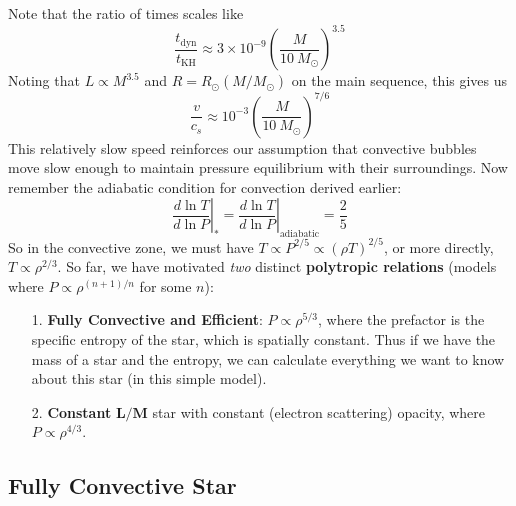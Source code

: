 \documentclass[10pt]{article}
\numberwithin{equation}{section}
\newcommand{\n}{\noindent}
\begin{document}
  \n Note that the ratio of times scales like
  \begin{equation}
    \label{eq:49}
    \frac{t_{\mathrm{dyn}}}{t_{\mathrm{KH}}}\approx 3\times
    10^{-9}\left(\frac{M}{10\ M_\odot}\right)^{3.5}
  \end{equation}
  Noting that $L\propto M^{3.5}$ and $R=R_\odot(M/M_\odot)$ on the
  main sequence, this gives us
  \begin{equation}
    \label{eq:50}
    \frac{v}{c_s}\approx 10^{-3}\left(\frac{M}{10\ M_\odot}\right)^{7/6}
  \end{equation}
  This relatively slow speed reinforces our assumption that convective
  bubbles move slow enough to maintain pressure equilibrium with their
  surroundings. Now remember the adiabatic condition for convection
  derived earlier:
  \begin{equation}
    \label{eq:51}
    \left.\frac{d\ln T}{d\ln P}\right|_*=\left.\frac{d\ln T}{d\ln P}\right|
_{\mathrm{adiabatic}}=\frac{2}{5}
  \end{equation}
  So in the convective zone, we must have $T\propto P^{2/5}\propto
  (\rho T)^{2/5}$, or more directly, $T\propto \rho^{2/3}$. So far, we
  have motivated \emph{two} distinct \textbf{polytropic relations}
  (models where $P\propto \rho^{(n+1)/n}$ for some $n$):
  \begin{enumerate}
  \item[1.] \textbf{Fully Convective and Efficient}: $P\propto \rho^{5/3}$,
    where the prefactor is the specific entropy of the star, which is
    spatially constant. Thus if we have the mass of a star and the
    entropy, we can calculate everything we want to know about this
    star (in this simple model).
  \item[2.] \textbf{Constant} $\bm{L/M}$ star with constant (electron 
scattering)
    opacity, where $P\propto \rho^{4/3}$.
  \end{enumerate}

  \subsection{Fully Convective Star}
  \label{sec:fully-conv-star}
\end{document}
